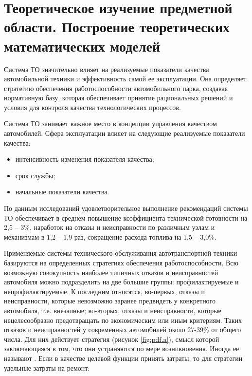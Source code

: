 \documentclass[../nirs.tex]{subfiles}
\begin{document}
\section{Теоретическое изучение предметной области. Построение теоретических
математических моделей}

Система ТО значительно влияет на реализуемые показатели качества автомобильной
техники и эффективность самой ее эксплуатации. Она определяет стратегию
обеспечения работоспособности автомобильного парка, создавая нормативную базу,
которая обеспечивает принятие рациональных решений и условия для контроля
качества технологических процессов.

Система ТО занимает важное место в концепции управления качеством автомобилей.
Сфера эксплуатации влияет на следующие реализуемые показатели качества:

\begin{itemize}

    \item интенсивность изменения показателя качества;

    \item срок службы;

    \item начальные показатели качества.

\end{itemize}

По данным исследований удовлетворительное выполнение рекомендаций системы ТО
обеспечивает в среднем повышение коэффициента технической готовности на 2,5 --
3\%, наработок на отказы и неисправности по различным узлам и механизмам в 1,2
-- 1,9 раз, сокращение расхода топлива на 1,5 -- 3,0\%.

Применяемые системы технического обслуживания автотранспортной техники
базируются на определенных стратегиях обеспечения работоспособности. Всю
возможную совокупность наиболее типичных отказов и неисправностей автомобиля
можно подразделить на две большие группы: профилактируемые и
непрофилактируемые. К последним относятся, во-первых, отказы и неисправности,
которые невозможно заранее предвидеть у конкретного автомобиля, т.е. внезапные;
во-вторых, отказы и неисправности, которые нецелесообразно предотвращать по
экономическим или иным критериям. Таких отказов и неисправностей у современных
автомобилей около 27-39\% от общего числа. Для них действует стратегия 
(рисунок \ref{fig:pdf.a}), смысл которой заключающаяся в том, что они
устраняются по мере возникновения. Иногда ее называют . Если в качестве целевой функции принять затраты, то для
стратегии  удельные затраты на ремонт:
\end{document}
